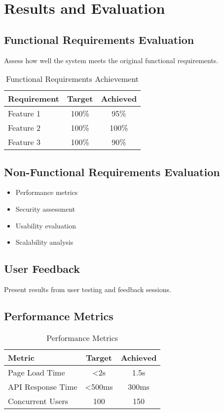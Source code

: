 \documentclass[12pt,a4paper]{article}
\begin{document}
\section{Results and Evaluation}
\label{sec:results}

\subsection{Functional Requirements Evaluation}
Assess how well the system meets the original functional requirements.

\begin{table}[H]
\centering
\begin{tabular}{@{}lcc@{}}
\toprule
Requirement & Target & Achieved \\ \midrule
Feature 1 & 100\% & 95\% \\
Feature 2 & 100\% & 100\% \\
Feature 3 & 100\% & 90\% \\
\bottomrule
\end{tabular}
\caption{Functional Requirements Achievement}
\label{tab:functional-requirements}
\end{table}

\subsection{Non-Functional Requirements Evaluation}
\begin{itemize}
    \item Performance metrics
    \item Security assessment
    \item Usability evaluation
    \item Scalability analysis
\end{itemize}

\subsection{User Feedback}
Present results from user testing and feedback sessions.

\subsection{Performance Metrics}
\begin{table}[H]
\centering
\begin{tabular}{@{}lcc@{}}
\toprule
Metric & Target & Achieved \\ \midrule
Page Load Time & <2s & 1.5s \\
API Response Time & <500ms & 300ms \\
Concurrent Users & 100 & 150 \\
\bottomrule
\end{tabular}
\caption{Performance Metrics}
\label{tab:performance-metrics}
\end{table}
\end{document}
